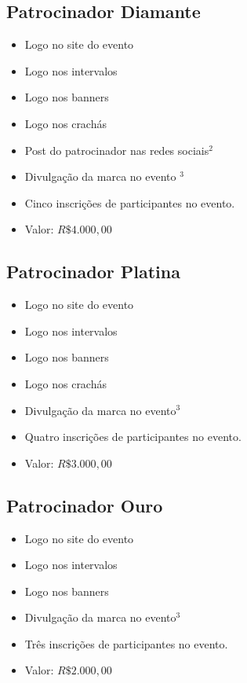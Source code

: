\documentclass[12pt]{article}
\begin{document}
\subsection{Patrocinador Diamante}
  \begin{itemize}[label={}]
  \setlength\itemsep{0.0em}
        \item Logo no site do evento
        \item Logo nos intervalos
        \item Logo nos banners
        \item Logo nos crachás
        \item Post do patrocinador nas redes sociais$^2$ 
        \item Divulgação da marca no evento $^3$ 
        \item Cinco inscrições de participantes no evento.
        \item Valor: $R\$ 4.000,00$
  \end{itemize}
\subsection{Patrocinador Platina}
  \begin{itemize}[label={}]
  \setlength\itemsep{0.0em}
        \item Logo no site do evento
        \item Logo nos intervalos
        \item Logo nos banners
        \item Logo nos crachás
        \item Divulgação da marca no evento$^3$
        \item Quatro inscrições de participantes no evento.
        \item Valor: $R\$ 3.000,00$
  \end{itemize}
\subsection{Patrocinador Ouro}
  \begin{itemize}[label={}]
  \setlength\itemsep{0.0em}
        \item Logo no site do evento
        \item Logo nos intervalos
        \item Logo nos banners
        \item Divulgação da marca no evento$^3$
        \item Três inscrições de participantes no evento.
        \item Valor: $R\$ 2.000,00$
  \end{itemize}
\end{document}
